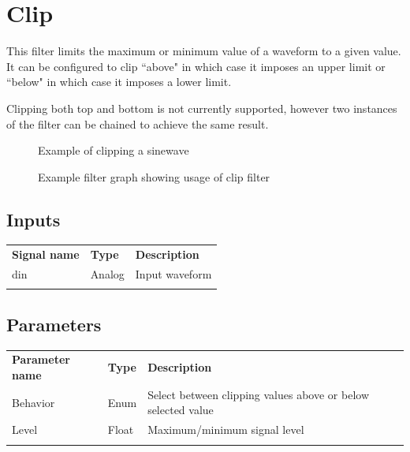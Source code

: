 \pagebreak
\section{Clip}
\label{filter:clip}

This filter limits the maximum or minimum value of a waveform to a given value. It can be configured
to clip ``above" in which case it imposes an upper limit or ``below" in which case it imposes a lower
limit.

Clipping both top and bottom is not currently supported, however two instances of the filter can be chained to achieve
the same result.

\begin{figure}[h]
\centering
{}
\caption{Example of clipping a sinewave}
\label{filter_clip}
\end{figure}

\begin{figure}[h]
\centering
{}
\caption{Example filter graph showing usage of clip filter}
\label{filter_graph_clip}
\end{figure}

\subsection{Inputs}

\begin{tabularx}{16cm}{llX}
\thickhline
\textbf{Signal name} & \textbf{Type} & \textbf{Description} \\
\thickhline
din & Analog & Input waveform \\
\thickhline
\end{tabularx}

\subsection{Parameters}

\begin{tabularx}{16cm}{llX}
\thickhline
\textbf{Parameter name} & \textbf{Type} & \textbf{Description} \\
\thickhline
Behavior & Enum & Select between clipping values above or below selected value\\
\thinhline
Level & Float & Maximum/minimum signal level\\
\thickhline
\end{tabularx}

